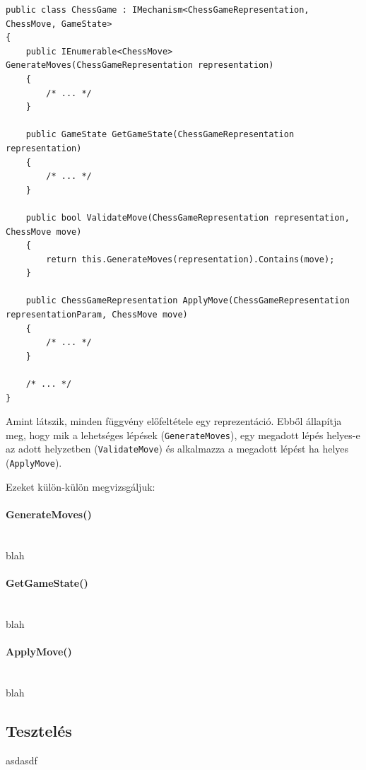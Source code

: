 \documentclass[twoside, a4paper, 12pt]{article}
\begin{document}
\begin{lstlisting}[caption=Sakk szabályok implementációja, label=lst:chessgame_code]
public class ChessGame : IMechanism<ChessGameRepresentation, ChessMove, GameState>
{
	public IEnumerable<ChessMove> GenerateMoves(ChessGameRepresentation representation)
	{ 
		/* ... */ 
	}
	
	public GameState GetGameState(ChessGameRepresentation representation)
	{ 
		/* ... */ 
	}
	
	public bool ValidateMove(ChessGameRepresentation representation, ChessMove move)
	{
		return this.GenerateMoves(representation).Contains(move);
	}
	
	public ChessGameRepresentation ApplyMove(ChessGameRepresentation representationParam, ChessMove move)
	{ 
		/* ... */ 
	}
	
	/* ... */
}
\end{lstlisting}

Amint látszik, minden függvény előfeltétele egy reprezentáció. Ebből állapítja meg, hogy mik a lehetséges lépések (\texttt{GenerateMoves}), egy megadott lépés helyes-e az adott helyzetben (\texttt{ValidateMove}) és alkalmazza a megadott lépést ha helyes (\texttt{ApplyMove}).

Ezeket külön-külön megvizsgáljuk:

\paragraph{GenerateMoves()} \mbox{} \\
blah

\paragraph{GetGameState()} \mbox{} \\
blah

\paragraph{ApplyMove()} \mbox{} \\
blah

\subsection{Tesztelés}

asdasdf
\end{document}
